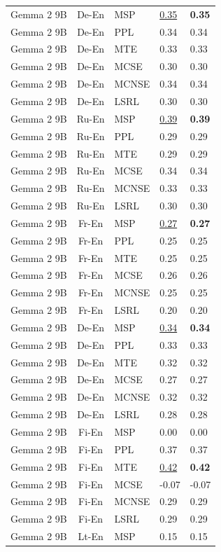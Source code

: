 \begin{table}
\begin{tabular}{lc}
Gemma 2 9B & De-En & MSP & \underline{0.35} & \textbf{0.35} \\
Gemma 2 9B & De-En & PPL & 0.34 & 0.34 \\
Gemma 2 9B & De-En & MTE & 0.33 & 0.33 \\
Gemma 2 9B & De-En & MCSE & 0.30 & 0.30 \\
Gemma 2 9B & De-En & MCNSE & 0.34 & 0.34 \\
Gemma 2 9B & De-En & LSRL & 0.30 & 0.30 \\
Gemma 2 9B & Ru-En & MSP & \underline{0.39} & \textbf{0.39} \\
Gemma 2 9B & Ru-En & PPL & 0.29 & 0.29 \\
Gemma 2 9B & Ru-En & MTE & 0.29 & 0.29 \\
Gemma 2 9B & Ru-En & MCSE & 0.34 & 0.34 \\
Gemma 2 9B & Ru-En & MCNSE & 0.33 & 0.33 \\
Gemma 2 9B & Ru-En & LSRL & 0.30 & 0.30 \\
Gemma 2 9B & Fr-En & MSP & \underline{0.27} & \textbf{0.27} \\
Gemma 2 9B & Fr-En & PPL & 0.25 & 0.25 \\
Gemma 2 9B & Fr-En & MTE & 0.25 & 0.25 \\
Gemma 2 9B & Fr-En & MCSE & 0.26 & 0.26 \\
Gemma 2 9B & Fr-En & MCNSE & 0.25 & 0.25 \\
Gemma 2 9B & Fr-En & LSRL & 0.20 & 0.20 \\
Gemma 2 9B & De-En & MSP & \underline{0.34} & \textbf{0.34} \\
Gemma 2 9B & De-En & PPL & 0.33 & 0.33 \\
Gemma 2 9B & De-En & MTE & 0.32 & 0.32 \\
Gemma 2 9B & De-En & MCSE & 0.27 & 0.27 \\
Gemma 2 9B & De-En & MCNSE & 0.32 & 0.32 \\
Gemma 2 9B & De-En & LSRL & 0.28 & 0.28 \\
Gemma 2 9B & Fi-En & MSP & 0.00 & 0.00 \\
Gemma 2 9B & Fi-En & PPL & 0.37 & 0.37 \\
Gemma 2 9B & Fi-En & MTE & \underline{0.42} & \textbf{0.42} \\
Gemma 2 9B & Fi-En & MCSE & -0.07 & -0.07 \\
Gemma 2 9B & Fi-En & MCNSE & 0.29 & 0.29 \\
Gemma 2 9B & Fi-En & LSRL & 0.29 & 0.29 \\
Gemma 2 9B & Lt-En & MSP & 0.15 & 0.15 \\

\end{tabular}
\end{table}
